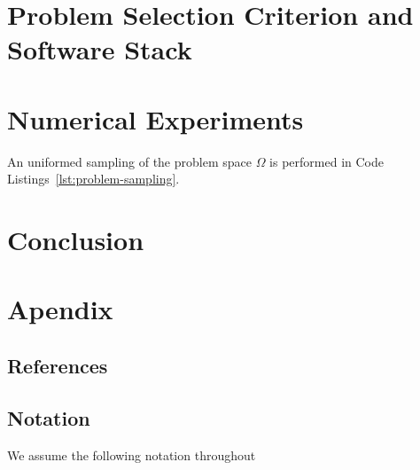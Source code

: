 \documentclass[10pt]{article}
\begin{document}


    \section{Problem Selection Criterion and Software Stack}
        \label{sec:problems}
        \medskip


    \section{Numerical Experiments}
        \label{sec:experiments}
        \medskip
        An uniformed sampling of the problem space $\Omega$ is performed
        in Code Listings~\ref{lst:problem-sampling}.

    \section{Conclusion}
        \label{sec:conclusion}
        \medskip
        \medskip

\newpage

\section{Apendix}
    \label{sec:appendix}
    \medskip

    
    \subsection*{References}
    \label{sec:bibliography}
    \medskip

    
    


    \subsection*{Notation}
        
        We assume the following notation throughout
\end{document}
